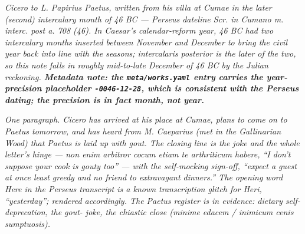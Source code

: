 
\textit{Cicero to L. Papirius Paetus, written from his villa at
Cumae in the later (second) intercalary month of 46 BC ---
Perseus dateline \textit{Scr. in Cumano m. interc. post a. 708
(46)}. In Caesar's calendar-reform year, 46 BC had two
intercalary months inserted between November and December to
bring the civil year back into line with the seasons;
\textit{intercalaris posterior} is the later of the two, so this
note falls in roughly mid-to-late December of 46 BC by the
Julian reckoning. \textbf{Metadata note: the
\texttt{meta/works.yaml} entry carries the year-precision
placeholder \texttt{-0046-12-28}, which is consistent with the
Perseus dating; the precision is in fact month, not year.}}

\textit{One paragraph. Cicero has arrived at his place at Cumae,
plans to come on to Paetus tomorrow, and has heard from M.
Caeparius (met in the Gallinarian Wood) that Paetus is laid up
with gout. The closing line is the joke and the whole letter's
hinge --- \textit{non enim arbitror cocum etiam te arthriticum
habere}, ``I don't suppose your cook is gouty too'' --- with the
self-mocking sign-off, ``expect a guest at once least greedy and
no friend to extravagant dinners.'' The opening word \textit{Here}
in the Perseus transcript is a known transcription glitch for
\textit{Heri}, ``yesterday''; rendered accordingly. The Paetus
register is in evidence: dietary self-deprecation, the gout-
joke, the chiastic close (\textit{minime edacem} / \textit{inimicum
cenis sumptuosis}).}
